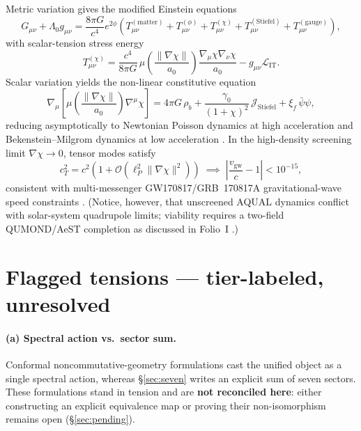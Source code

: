 \documentclass{alienfolio}
\begin{document}
Metric variation gives the modified Einstein equations
\begin{equation}
G_{\mu\nu} + \Lambda_0 g_{\mu\nu}
= \frac{8\pi G}{c^4}e^{2\phi}
\left(T_{\mu\nu}^{(\mathrm{matter})} + T_{\mu\nu}^{(\phi)}
+ T_{\mu\nu}^{(\chi)} + T_{\mu\nu}^{(\mathrm{Stiefel})}
+ T_{\mu\nu}^{(\mathrm{gauge})}\right),
\end{equation}
with scalar-tension stress energy
\begin{equation}
T_{\mu\nu}^{(\chi)} = \frac{c^4}{8\pi G}\,
\mu\!\left(\frac{\|\nabla\chi\|}{a_0}\right)
\frac{\nabla_\mu\chi\nabla_\nu\chi}{a_0}
- g_{\mu\nu}\mathcal{L}_{\mathrm{IT}} .
\end{equation}
Scalar variation yields the non-linear constitutive equation
\begin{equation}
\nabla_\mu\!\left[\mu\!\left(\frac{\|\nabla\chi\|}{a_0}\right)
\nabla^\mu\chi\right]
= 4\pi G\,\rho_b
+ \frac{\gamma_0}{(1+\chi)^2}\,\mathcal{J}_{\mathrm{Stiefel}}
+ \xi_f\,\bar\psi\psi,
\end{equation}
reducing asymptotically to Newtonian Poisson dynamics at high
acceleration and Bekenstein--Milgrom dynamics \cite{bekenstein_milgrom84}
at low acceleration . In the high-density screening
limit $\nabla\chi \to 0$, tensor modes satisfy
\begin{equation}
c_T^2 = c^2\left(1 + \mathcal{O}(\ell_P^2\|\nabla\chi\|^2)\right)
\;\implies\; \left|\frac{v_{\mathrm{gw}}}{c}-1\right| < 10^{-15},
\end{equation}
consistent with multi-messenger GW170817/GRB~170817A gravitational-wave
speed constraints \cite{abbott17} . (Notice,
however, that unscreened AQUAL dynamics conflict with solar-system
quadrupole limits; viability requires a two-field QUMOND/AeST completion
as discussed in Folio~I \cite{folio-i}.)

\section{Flagged tensions --- tier-labeled, unresolved}
\label{sec:tensions}

\paragraph{(a) Spectral action vs.\ sector sum.}
Conformal noncommutative-geometry formulations cast the unified object
as a single spectral action, whereas \S\ref{sec:seven} writes an explicit
sum of seven sectors. These formulations stand in tension and are
\textbf{not reconciled here}: either constructing an explicit equivalence
map or proving their non-isomorphism remains open (\S\ref{sec:pending}).
\end{document}
